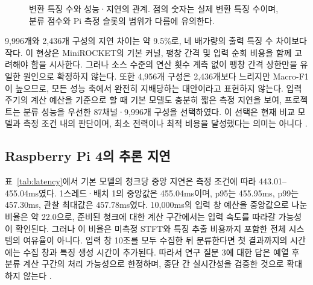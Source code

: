 \documentclass[11pt,a4paper]{article}
\newcommand{\sourceproject}{\citep{project2026}}
\newcommand{\smalltable}[1]{\begingroup\small\setlength{\tabcolsep}{5pt}\endgroup}
\begin{document}
\begin{table}[htbp]
\centering
\caption{87채널의 변환 특징 수 스윕. 분류 점수는 세 차종 평균, 모델 크기는 학습 리포트의 차종별 직렬화 크기, 지연은 Pi의 IONIQ·1스레드·배치 1 조건이다.}
\label{tab:kernels}
\resizebox{\linewidth}{!}{\smalltable{kernels.tex}}
\end{table}

\begin{figure}[htbp]
\centering
{}
\caption{변환 특징 수와 성능·지연의 관계. 점의 숫자는 실제 변환 특징 수이며, 분류 점수와 Pi 측정 슬롯의 범위가 다름에 유의한다.}
\label{fig:tradeoff}
\end{figure}

9,996개와 2,436개 구성의 지연 차이는 약 9.5\%로, 네 배가량의 출력 특징 수 차이보다 작다.
이 현상은 MiniROCKET의 기본 커널, 팽창 간격 및 입력 순회 비용을 함께 고려해야 함을 시사한다.
그러나 소스 수준의 연산 횟수 계측 없이 팽창 간격 상한만을 유일한 원인으로 확정하지 않는다.
또한 4,956개 구성은 2,436개보다 느리지만 Macro-F1이 높으므로, 모든 성능 축에서 완전히 지배당하는 대안이라고 표현하지 않는다.
입력 주기의 계산 예산을 기준으로 할 때 기본 모델도 충분히 짧은 측정 지연을 보여, 프로젝트는 분류 성능을 우선한 87채널·9,996개 구성을 선택하였다.
이 선택은 현재 비교 모델과 측정 조건 내의 판단이며, 최소 전력이나 최적 비용을 달성했다는 의미는 아니다 \sourceproject.

\subsection{Raspberry Pi 4의 추론 지연}
표~\ref{tab:latency}에서 기본 모델의 청크당 중앙 지연은 측정 조건에 따라 443.01--455.04ms였다.
1스레드·배치 1의 중앙값은 455.04ms이며, p95는 455.95ms, p99는 457.30ms, 관찰 최대값은 457.78ms였다.
10,000ms의 입력 창 예산을 중앙값으로 나눈 비율은 약 22.0으로, 준비된 청크에 대한 계산 구간에서는 입력 속도를 따라갈 가능성이 확인된다.
그러나 이 비율은 미측정 STFT와 특징 추출 비용까지 포함한 전체 시스템의 여유율이 아니다.
입력 창 10초를 모두 수집한 뒤 분류한다면 첫 결과까지의 시간에는 수집 창과 특징 생성 시간이 추가된다.
따라서 연구 질문 3에 대한 답은 예열 후 분류 계산 구간의 처리 가능성으로 한정하며, 종단 간 실시간성을 검증한 것으로 확대하지 않는다 \sourceproject.
\end{document}
